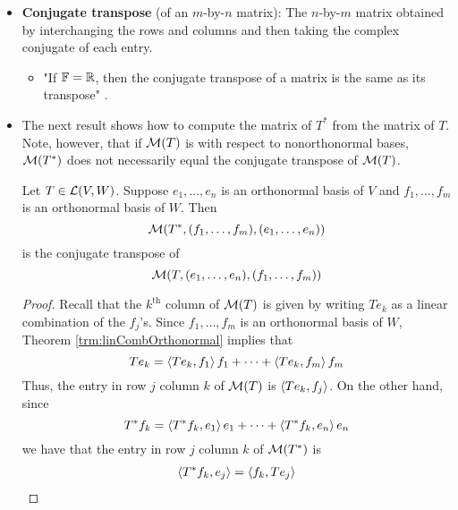 \documentclass[../main.tex]{subfiles}
\begin{document}
\begin{itemize}
\begin{theorem}
\begin{enumerate}[label={\textup{(}\alph*\textup{)}},ref={\thetheorem\alph*}]
\begin{proof}
                as desired.
            \end{proof}
        \end{enumerate}
    \end{theorem}
    \item \textbf{Conjugate transpose} (of an $m$-by-$n$ matrix): The $n$-by-$m$ matrix obtained by interchanging the rows and columns and then taking the complex conjugate of each entry.
    \begin{itemize}
        \item "If $\mathbb{F}=\mathbb{R}$, then the conjugate transpose of a matrix is the same as its transpose" \parencite[207]{bib:Axler}.
    \end{itemize}
    \item The next result shows how to compute the matrix of $T^*$ from the matrix of $T$. Note, however, that if $\mathcal{M}(T)$ is with respect to nonorthonormal bases, $\mathcal{M}(T^*)$ does not necessarily equal the conjugate transpose of $\mathcal{M}(T)$.
    \begin{theorem}
        Let $T\in\mathcal{L}(V,W)$. Suppose $e_1,\dots,e_n$ is an orthonormal basis of $V$ and $f_1,\dots,f_m$ is an orthonormal basis of $W$. Then
        \begin{equation*}
            \mathcal{M}(T^*,(f_1,\dots,f_m),(e_1,\dots,e_n))
        \end{equation*}
        is the conjugate transpose of
        \begin{equation*}
            \mathcal{M}(T,(e_1,\dots,e_n),(f_1,\dots,f_m))
        \end{equation*}
        \begin{proof}
            Recall that the $k^\text{th}$ column of $\mathcal{M}(T)$ is given by writing $Te_k$ as a linear combination of the $f_j$'s. Since $f_1,\dots,f_m$ is an orthonormal basis of $W$, Theorem \ref{trm:linCombOrthonormal} implies that
            \begin{equation*}
                Te_k = \left\langle{Te_k},{f_1}\right\rangle f_1+\cdots+\left\langle{Te_k},{f_m}\right\rangle f_m
            \end{equation*}
            Thus, the entry in row $j$ column $k$ of $\mathcal{M}(T)$ is $\left\langle{Te_k},{f_j}\right\rangle$. On the other hand, since
            \begin{equation*}
                T^*f_k = \left\langle{T^*f_k},{e_1}\right\rangle e_1+\cdots+\left\langle{T^*f_k},{e_n}\right\rangle e_n
            \end{equation*}
            we have that the entry in row $j$ column $k$ of $\mathcal{M}(T^*)$ is
            \begin{align*}
                \inp{T^*f_k}{e_j} &= \inp{f_k}{Te_j}\\

\end{align*}
\end{proof}
\end{theorem}
\end{itemize}
\end{document}
